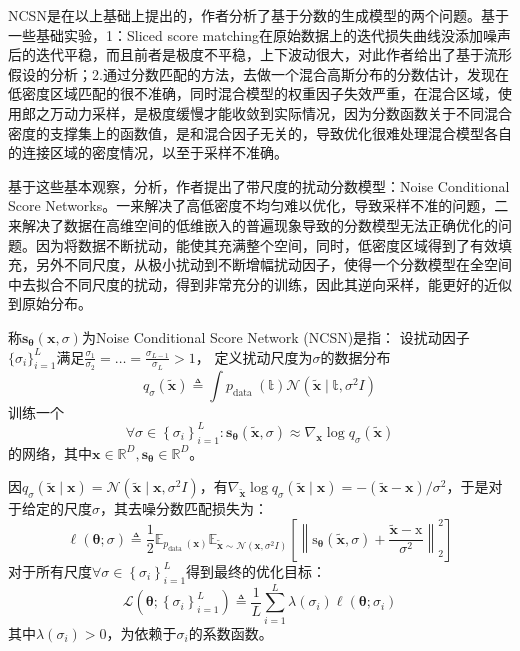 \documentclass[lang=cn,newtx,10pt,scheme=chinese]{elegantbook}
\begin{document}
NCSN是在以上基础上提出的，作者分析了基于分数的生成模型的两个问题。基于一些基础实验，1：Sliced score matching在原始数据上的迭代损失曲线没添加噪声后的迭代平稳，而且前者是极度不平稳，上下波动很大，对此作者给出了基于流形假设的分析；2.通过分数匹配的方法，去做一个混合高斯分布的分数估计，发现在低密度区域匹配的很不准确，同时混合模型的权重因子失效严重，在混合区域，使用郎之万动力采样，是极度缓慢才能收敛到实际情况，因为分数函数关于不同混合密度的支撑集上的函数值，是和混合因子无关的，导致优化很难处理混合模型各自的连接区域的密度情况，以至于采样不准确。

基于这些基本观察，分析，作者提出了带尺度的扰动分数模型：Noise Conditional Score Networks。一来解决了高低密度不均匀难以优化，导致采样不准的问题，二来解决了数据在高维空间的低维嵌入的普遍现象导致的分数模型无法正确优化的问题。因为将数据不断扰动，能使其充满整个空间，同时，低密度区域得到了有效填充，另外不同尺度，从极小扰动到不断增幅扰动因子，使得一个分数模型在全空间中去拟合不同尺度的扰动，得到非常充分的训练，因此其逆向采样，能更好的近似到原始分布。

称$\mathbf{s}_{\boldsymbol{\theta}}(\mathbf{x}, \sigma)$为Noise Conditional Score Network (NCSN)是指：
设扰动因子$\{\sigma_i\}_{i=1}^{L}$满足$\frac{\sigma_1}{\sigma_2}=\dots=\frac{\sigma_{L-1}}{\sigma_L}>1 $，
定义扰动尺度为$\sigma$的数据分布
\begin{equation}
q_\sigma(\tilde{\mathbf{x}}) \triangleq \int p_{\text {data }}(\mathbb{t}) \mathcal{N}(\tilde{\mathbf{x}} \mid \mathbb{t}, \sigma^2I)
\end{equation}
训练一个
\begin{equation}
\forall \sigma \in\left\{\sigma_i\right\}_{i=1}^L: \mathbf{s}_{\boldsymbol{\theta}}(\tilde{\mathbf{x}}, \sigma) \approx \nabla_{\mathbf{x}} \log q_\sigma(\tilde{\mathbf{x}})
\end{equation}
的网络，其中$ \mathbf{x} \in \mathbb{R}^{D}, \mathbf{s}_{\boldsymbol{\theta}} \in \mathbb{R}^{D}$。

因$q_\sigma(\tilde{\mathbf{x}} \mid \mathbf{x})=\mathcal{N}\left(\tilde{\mathbf{x}} \mid \mathbf{x}, \sigma^2 I\right)$，有$\nabla_{\tilde{\mathbf{x}}} \log q_\sigma(\tilde{\mathbf{x}} \mid \mathbf{x})=-(\tilde{\mathbf{x}}-\mathbf{x}) / \sigma^2$，于是对于给定的尺度$\sigma$，其去噪分数匹配损失为：
\begin{equation}
\ell(\boldsymbol{\theta} ; \sigma) \triangleq \frac{1}{2} \mathbb{E}_{p_{\text {data }}(\mathbf{x})} \mathbb{E}_{\tilde{\mathbf{x}} \sim \mathcal{N}\left(\mathbf{x}, \sigma^2 I\right)}\left[\left\|\mathrm{s}_{\boldsymbol{\theta}}(\tilde{\mathbf{x}}, \sigma)+\frac{\tilde{\mathbf{x}}-\mathrm{x}}{\sigma^2}\right\|_2^2\right]
\end{equation}
对于所有尺度$\forall \sigma \in\left\{\sigma_i\right\}_{i=1}^L$得到最终的优化目标：
\begin{equation}
\mathcal{L}\left(\boldsymbol{\theta} ;\left\{\sigma_i\right\}_{i=1}^L\right) \triangleq \frac{1}{L} \sum_{i=1}^L \lambda\left(\sigma_i\right) \ell\left(\boldsymbol{\theta} ; \sigma_i\right)
\end{equation}其中$ \lambda\left(\sigma_i\right)>0$，为依赖于$\sigma_i$的系数函数。
\end{document}
